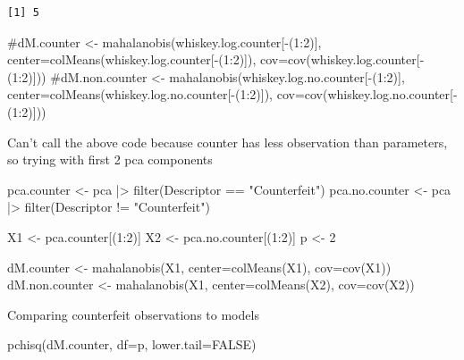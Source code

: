 \documentclass[
  letterpaper,
  DIV=11,
  numbers=noendperiod]{scrartcl}
\newenvironment{Shaded}{\begin{snugshade}}{\end{snugshade}}
\newcommand{\AttributeTok}[1]{\textcolor[rgb]{0.40,0.45,0.13}{#1}}
\newcommand{\CommentTok}[1]{\textcolor[rgb]{0.37,0.37,0.37}{#1}}
\newcommand{\ConstantTok}[1]{\textcolor[rgb]{0.56,0.35,0.01}{#1}}
\newcommand{\DecValTok}[1]{\textcolor[rgb]{0.68,0.00,0.00}{#1}}
\newcommand{\FunctionTok}[1]{\textcolor[rgb]{0.28,0.35,0.67}{#1}}
\newcommand{\NormalTok}[1]{\textcolor[rgb]{0.00,0.23,0.31}{#1}}
\newcommand{\OtherTok}[1]{\textcolor[rgb]{0.00,0.23,0.31}{#1}}
\newcommand{\SpecialCharTok}[1]{\textcolor[rgb]{0.37,0.37,0.37}{#1}}
\newcommand{\StringTok}[1]{\textcolor[rgb]{0.13,0.47,0.30}{#1}}
\begin{document}
\begin{verbatim}
[1] 5
\end{verbatim}

\begin{Shaded}
\begin{Highlighting}[]
\CommentTok{\#dM.counter \textless{}{-} mahalanobis(whiskey.log.counter[{-}(1:2)], center=colMeans(whiskey.log.counter[{-}(1:2)]), cov=cov(whiskey.log.counter[{-}(1:2)]))}
\CommentTok{\#dM.non.counter \textless{}{-} mahalanobis(whiskey.log.no.counter[{-}(1:2)], center=colMeans(whiskey.log.no.counter[{-}(1:2)]), cov=cov(whiskey.log.no.counter[{-}(1:2)]))}
\end{Highlighting}
\end{Shaded}

Can't call the above code because counter has less observation than
parameters, so trying with first 2 pca components

\begin{Shaded}
\begin{Highlighting}[]
\NormalTok{pca.counter }\OtherTok{\textless{}{-}}\NormalTok{ pca }\SpecialCharTok{|\textgreater{}} \FunctionTok{filter}\NormalTok{(Descriptor }\SpecialCharTok{==} \StringTok{"Counterfeit"}\NormalTok{)}
\NormalTok{pca.no.counter }\OtherTok{\textless{}{-}}\NormalTok{ pca }\SpecialCharTok{|\textgreater{}} \FunctionTok{filter}\NormalTok{(Descriptor }\SpecialCharTok{!=} \StringTok{"Counterfeit"}\NormalTok{)}

\NormalTok{X1 }\OtherTok{\textless{}{-}}\NormalTok{ pca.counter[(}\DecValTok{1}\SpecialCharTok{:}\DecValTok{2}\NormalTok{)]}
\NormalTok{X2 }\OtherTok{\textless{}{-}}\NormalTok{ pca.no.counter[(}\DecValTok{1}\SpecialCharTok{:}\DecValTok{2}\NormalTok{)]}
\NormalTok{p }\OtherTok{\textless{}{-}} \DecValTok{2}

\NormalTok{dM.counter }\OtherTok{\textless{}{-}} \FunctionTok{mahalanobis}\NormalTok{(X1, }\AttributeTok{center=}\FunctionTok{colMeans}\NormalTok{(X1), }\AttributeTok{cov=}\FunctionTok{cov}\NormalTok{(X1))}
\NormalTok{dM.non.counter }\OtherTok{\textless{}{-}} \FunctionTok{mahalanobis}\NormalTok{(X1, }\AttributeTok{center=}\FunctionTok{colMeans}\NormalTok{(X2), }\AttributeTok{cov=}\FunctionTok{cov}\NormalTok{(X2))}
\end{Highlighting}
\end{Shaded}

Comparing counterfeit observations to models

\begin{Shaded}
\begin{Highlighting}[]
\FunctionTok{pchisq}\NormalTok{(dM.counter, }\AttributeTok{df=}\NormalTok{p, }\AttributeTok{lower.tail=}\ConstantTok{FALSE}\NormalTok{)}
\end{Highlighting}
\end{Shaded}
\end{document}

